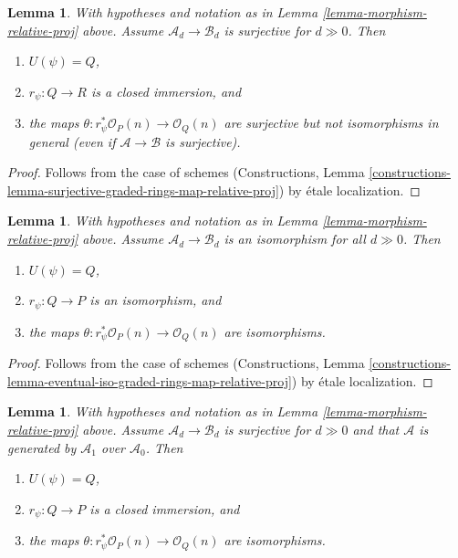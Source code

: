 \documentclass{stacks-project}
\theoremstyle{plain}
\newtheorem{lemma}[subsection]{Lemma}
\theoremstyle{definition}
\theoremstyle{remark}
\numberwithin{equation}{subsection}
\begin{document}
\begin{lemma}
\label{lemma-surjective-graded-rings-map-relative-proj}
With hypotheses and notation as in Lemma \ref{lemma-morphism-relative-proj}
above. Assume $\mathcal{A}_d \to \mathcal{B}_d$ is surjective for
$d \gg 0$. Then
\begin{enumerate}
\item $U(\psi) = Q$,
\item $r_\psi : Q \to R$ is a closed immersion, and
\item the maps $\theta : r_\psi^*\mathcal{O}_P(n) \to \mathcal{O}_Q(n)$
are surjective but not isomorphisms in general (even if
$\mathcal{A} \to \mathcal{B}$ is surjective).
\end{enumerate}
\end{lemma}

\begin{proof}
Follows from the case of schemes
(Constructions, Lemma
\ref{constructions-lemma-surjective-graded-rings-map-relative-proj})
by \'etale localization.
\end{proof}

\begin{lemma}
\label{lemma-eventual-iso-graded-rings-map-relative-proj}
With hypotheses and notation as in Lemma \ref{lemma-morphism-relative-proj}
above. Assume $\mathcal{A}_d \to \mathcal{B}_d$ is an isomorphism for all
$d \gg 0$. Then
\begin{enumerate}
\item $U(\psi) = Q$,
\item $r_\psi : Q \to P$ is an isomorphism, and
\item the maps $\theta : r_\psi^*\mathcal{O}_P(n) \to \mathcal{O}_Q(n)$
are isomorphisms.
\end{enumerate}
\end{lemma}

\begin{proof}
Follows from the case of schemes
(Constructions, Lemma
\ref{constructions-lemma-eventual-iso-graded-rings-map-relative-proj})
by \'etale localization.
\end{proof}

\begin{lemma}
\label{lemma-surjective-generated-degree-1-map-relative-proj}
With hypotheses and notation as in Lemma \ref{lemma-morphism-relative-proj}
above. Assume $\mathcal{A}_d \to \mathcal{B}_d$ is surjective for $d \gg 0$
and that $\mathcal{A}$ is generated by $\mathcal{A}_1$ over $\mathcal{A}_0$.
Then
\begin{enumerate}
\item $U(\psi) = Q$,
\item $r_\psi : Q \to P$ is a closed immersion, and
\item the maps $\theta : r_\psi^*\mathcal{O}_P(n) \to \mathcal{O}_Q(n)$
are isomorphisms.
\end{enumerate}
\end{lemma}
\end{document}
